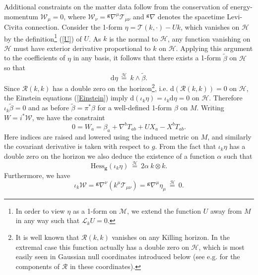 \documentclass[11pt, reqno]{amsart}
\theoremstyle{plain}
\theoremstyle{definition}
\numberwithin{equation}{section}
\begin{document}
Additional constraints on the matter data follow from the conservation of energy-momentum $\mathcal{W}_\mu = 0$, where $\mathcal{W}_\nu = {^\textbf{g}}\nabla^\mu\mathcal{T}_{\mu\nu}$ and ${^\textbf{g}}\nabla$ denotes the spacetime Levi-Civita connection. 
Consider the 1-form $\eta = \mathcal{T}(k,\cdot)-Uk$, which vanishes on $\mathcal{H}$ by the definition\footnote{In order to view $\eta$ as a 1-form on $\mathcal{M}$, we extend the function $U$ away from $M$ in any way such that $\mathcal{L}_k U = 0$.} (\ref{U}) of $U$. As $k$ is the normal to $\mathcal{H}$, any function vanishing on $\mathcal{H}$ must have exterior derivative proportional to $k$ on $\mathcal{H}$. Applying this argument to the coefficients of $\eta$ in any basis, it follows that there exists a 1-form $\tilde{\beta}$ on $\mathcal{H}$ so that
\begin{equation} \label{betadef}
\text{d}\eta \:\overset{\mathcal{H}}{=}\: k \wedge \tilde{\beta}.
\end{equation}
Since $\mathcal{R}(k,k)$ has a double zero on the horizon\footnote{It is well known that $\mathcal{R}(k,k)$ vanishes on any Killing horizon. In the extremal case this function actually has a double zero on $\mathcal{H}$, which is most easily seen in Gaussian null coordinates introduced below (see e.g. \cite{MI83} for the components of $\mathcal{R}$ in these coordinates).}, i.e. d$(\mathcal{R}(k,k)) = 0$ on $\mathcal{H}$, the Einstein equations (\ref{Einstein}) imply d$(\iota_k \eta) = \iota_k\text{d}\eta = 0$ on $\mathcal{H}$. Therefore $\iota_k\tilde{\beta} = 0$ and as before $\tilde{\beta} = \pi^* \beta$ for a well-defined 1-form $\beta$ on $M$. Writing $W = i^*\mathcal{W}$, we have the constraint
\begin{equation} \label{c1}
0 = W_a = \beta_a + \nabla^bT_{ab} + UX_a - X^bT_{ab}.
\end{equation}
Here indices are raised and lowered using the induced metric on $M$, and similarly the covariant derivative is taken with respect to $g$. From the fact that $\iota_k\eta$ has a double zero on the horizon we also deduce the existence of a function $\alpha$ such that 
\begin{equation} \label{alphadef}
    \text{Hess}_{\textbf{g}}(\iota_k\eta) \:\overset{\mathcal{H}}{=}\: 2\alpha \:k\otimes k.
\end{equation}
Furthermore, we have
\begin{equation*}
    \iota_k \mathcal{W} = {^{\textbf{g}}}\nabla^\nu (k^\mu\mathcal{T}_{\mu\nu}) = {^{\textbf{g}}}\nabla^\mu \eta_\mu \:\overset{\mathcal{H}}{=}\: 0.
\end{equation*}
\end{document}
